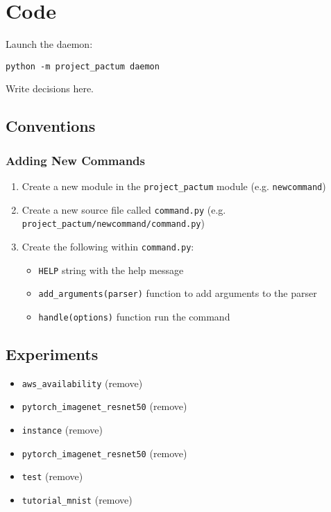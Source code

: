 \chapter{Code}
\label{chap:code}

Launch the daemon:

\noindent \lstinline|python -m project_pactum daemon|

Write decisions here.

\section{Conventions}

\subsection{Adding New Commands}

\begin{enumerate}
  \item Create a new module in the \lstinline|project_pactum| module (e.g. \lstinline|newcommand|)
  \item Create a new source file called \lstinline|command.py| (e.g. \lstinline|project_pactum/newcommand/command.py|)
  \item Create the following within \lstinline|command.py|:
    \begin{itemize}
      \item \lstinline|HELP| string with the help message
      \item \lstinline|add_arguments(parser)| function to add arguments to the parser
      \item \lstinline|handle(options)| function run the command
    \end{itemize}
\end{enumerate}

\section{Experiments}

\begin{itemize}
  \item \lstinline|aws_availability| {\color{solarizedRed}(remove)}
  \item \lstinline|pytorch_imagenet_resnet50| {\color{solarizedRed}(remove)}
  \item \lstinline|instance| {\color{solarizedRed}(remove)}
  \item \lstinline|pytorch_imagenet_resnet50| {\color{solarizedRed}(remove)}
  \item \lstinline|test| {\color{solarizedRed}(remove)}
  \item \lstinline|tutorial_mnist| {\color{solarizedRed}(remove)}
\end{itemize}

